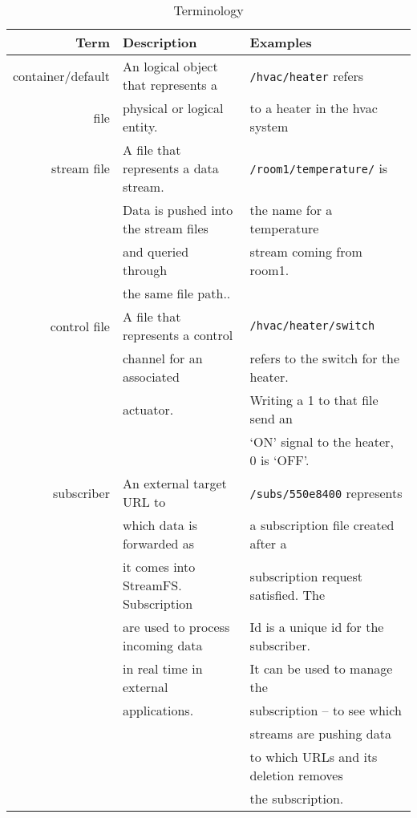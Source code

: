 \begin{table}[h!]
\begin{center}
\begin{tabular}{| r | l | l |}
	\hline
	\textbf{Term} & \textbf{Description} & \textbf{Examples}\\ \hline


	container/default & An logical object that represents a & \texttt{/hvac/heater} refers  \\ 
				 file & physical or logical entity.    	 & to a heater in the hvac system \\ \hline

	stream file & A file that represents a data stream.  	& \texttt{/room1/temperature/} is  \\
				& Data is pushed into the stream files      & the name for a temperature \\
				&  and queried through 						& stream coming from room1.\\
				& the same file path..    					& 							\\		 \hline

	control file & A file that represents a control  & \texttt{/hvac/heater/switch}  \\
				 & 	channel for an associated 		 & refers to the switch for the heater.  \\
				 &	actuator.						 & Writing a 1 to that file send an \\
				 &   								 & `ON' signal to the heater, 0 is `OFF'.\\ \hline

	subscriber 	& An external target URL to  				& \texttt{/subs/550e8400} represents \\
				& which data is forwarded as  				& a subscription file created after a \\
			   	& it comes into StreamFS. Subscription   	& subscription request satisfied. The  		\\
			   	& are used to process incoming data 		& Id is a unique id for the subscriber. 		\\
			   	& in real time in external 					& It can be used to manage the   	\\
			   	& applications.								& subscription -- to see which \\
			   	&											& streams are pushing data	\\
			   	& 											& to which URLs and its deletion removes 	\\
			   	&											& the subscription.							\\ \hline

\end{tabular}
\caption{Terminology}
\label{tab:tutorial_terminology}
\end{center}
\end{table}

